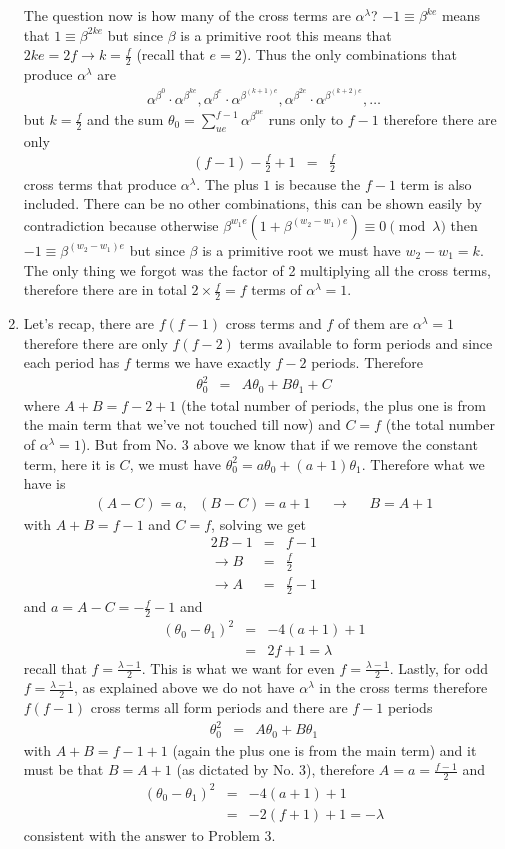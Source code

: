 \documentclass[aps,preprint,preprintnumbers,nofootinbib,showpacs,prd]{revtex4-1}
\newcommand{\nbea}{\begin{eqnarray*}}
\newcommand{\neea}{\end{eqnarray*}}
\begin{document}
\begin{enumerate}
The question now is how many of the cross terms are $\alpha^{\lambda}$? $-1 \equiv \beta^{ke}$ means that $1 \equiv \beta^{2ke}$ but since $\beta$ is a primitive root this means that $2ke = 2f \to k = \frac{f}{2}$ (recall that $e=2$). Thus the only combinations that produce $\alpha^\lambda$ are
%
\nbea
\alpha^{\beta^0} \cdot \alpha^{\beta^{ke}}, \alpha^{\beta^e} \cdot \alpha^{\beta^{(k+1)e}}, \alpha^{\beta^{2e}} \cdot \alpha^{\beta^{(k+2)e}}, \dots  
\neea
%
but $k = \frac{f}{2}$ and the sum $\theta_0 = \sum_{ue}^{f-1} \alpha^{\beta^{ue}}$ runs only to $f-1$ therefore there are only
%
\nbea
(f-1) - \frac{f}{2} + 1 & = & \frac{f}{2}
\neea
%
cross terms that produce $\alpha^\lambda$. The plus $1$ is because the $f-1$ term is also included. There can be no other combinations, this can be shown easily by contradiction because otherwise $\beta^{w_1 e}(1 + \beta^{(w_2 - w_1) e}) \equiv 0 \pmod{\lambda}$ then $-1 \equiv \beta^{(w_2 - w_1)e}$ but since $\beta$ is a primitive root we must have $w_2 - w_1 = k$. The only thing we forgot was the factor of 2 multiplying all the cross terms, therefore there are in total $2 \times \frac{f}{2} = f$ terms of $\alpha^{\lambda} = 1$.
%
\item Let's recap, there are $f(f-1)$ cross terms and $f$ of them are $\alpha^{\lambda} = 1$ therefore there are only $f(f - 2)$ terms available to form periods and since each period has $f$ terms we have exactly $f-2$ periods. Therefore
%
\nbea
\theta_0^2 & = & A\theta_0 + B\theta_1 + C
\neea
%
where $A + B = f - 2 + 1$ (the total number of periods, the plus one is from the main term that we've not touched till now) and $C = f$ (the total number of $\alpha^\lambda = 1$). But from No. 3 above we know that if we remove the constant term, here it is $C$, we must have $\theta_0^2 = a\theta_0 + (a+1)\theta_1$. Therefore what we have is
%
\nbea
(A - C) = a,~~~ (B - C) = a + 1 ~~~~~~\to ~~~~~~ B = A + 1
\neea
%
with $A + B = f - 1$ and $C = f$, solving we get
%
\nbea
2B - 1 & = & f - 1 \\
\to B & = & \frac{f}{2} \\
\to A & = & \frac{f}{2} - 1
\neea
% 
and $a = A - C = -\frac{f}{2} - 1$ and
%
\nbea
(\theta_0 - \theta_1)^2 & = & -4(a + 1) + 1 \\
& = & 2 f + 1 = \lambda
\neea
%
recall that $f = \frac{\lambda - 1}{2}$. This is what we want for even $f = \frac{\lambda - 1}{2}$. Lastly, for odd $f = \frac{\lambda - 1}{2}$, as explained above we do not have $\alpha^\lambda$ in the cross terms therefore $f(f-1)$ cross terms all form periods and there are $f - 1$ periods
%
\nbea
\theta_0^2 & = & A\theta_0 + B\theta_1
\neea
%
with $A + B = f - 1 + 1$ (again the plus one is from the main term) and it must be that $B = A + 1$ (as dictated by No. 3), therefore $A = a = \frac{f - 1}{2}$ and
%
\nbea
(\theta_0 - \theta_1)^2 & = & -4(a + 1) + 1 \\
& = & -2 (f+1) + 1 = -\lambda
\neea
%
consistent with the answer to Problem 3.
%
\end{enumerate} 
%
\end{document}
